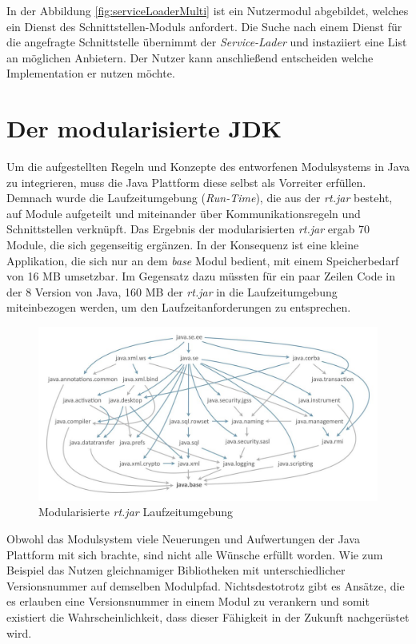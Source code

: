     In der Abbildung \ref{fig:serviceLoaderMulti} ist ein Nutzermodul abgebildet, welches ein Dienst des Schnittstellen-Moduls anfordert. Die Suche nach einem Dienst für die angefragte Schnittstelle übernimmt der \textit{Service-Lader} und instaziiert eine List an möglichen Anbietern. Der Nutzer kann anschließend entscheiden welche Implementation er nutzen möchte.   


\section{Der modularisierte JDK} \label{sec:modular_java_base}
  Um die aufgestellten Regeln und Konzepte des entworfenen Modulsystems in Java zu integrieren, muss die Java Plattform diese selbst als Vorreiter erfüllen. \bigbreak
  Demnach wurde die Laufzeitumgebung (\textit{Run-Time}), die aus der \textit{rt.jar} besteht, auf Module aufgeteilt und miteinander über Kommunikationsregeln und Schnittstellen verknüpft. Das Ergebnis der modularisierten \textit{rt.jar} ergab 70 Module, die sich gegenseitig ergänzen. \newline
  In der Konsequenz ist eine kleine Applikation, die sich nur an dem \textit{base} Modul bedient, mit einem Speicherbedarf von 16 MB umsetzbar. Im Gegensatz dazu müssten für ein paar Zeilen Code in der 8 Version von Java, 160 MB der \textit{rt.jar} in die Laufzeitumgebung miteinbezogen werden, um den Laufzeitanforderungen zu entsprechen.\bigbreak
  \begin{figure}[h!]
   \centering
   \includegraphics[width=\textwidth]{material/images/moduleGraph.jpg}
   \caption{Modularisierte \textit{rt.jar} Laufzeitumgebung \cite{modGraph}}
   \label{fig:jdk}
  \end{figure}
  Obwohl das Modulsystem viele Neuerungen und Aufwertungen der Java Plattform mit sich brachte, sind nicht alle Wünsche erfüllt worden. Wie zum Beispiel das Nutzen gleichnamiger Bibliotheken mit unterschiedlicher Versionsnummer auf demselben Modulpfad.\newline
  Nichtsdestotrotz gibt es Ansätze, die es erlauben eine Versionsnummer in einem Modul zu verankern und somit existiert die Wahrscheinlichkeit, dass dieser Fähigkeit in der Zukunft nachgerüstet wird. 
 

